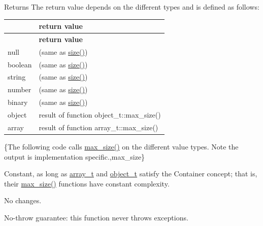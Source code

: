 \begin{DoxyReturn}{Returns}
The return value depends on the different types and is defined as follows\+: \tabulinesep=1mm
\begin{longtabu} spread 0pt [c]{*2{|X[-1]}|}
\hline
{}&{\bf return value  }\\
\endfirsthead
\hline
\endfoot
\hline
{}&{\bf return value  }\\
\endhead
null &{} (same as {\ttfamily \hyperlink{classnlohmann_1_1basic__json_a33c7c8638bb0b12e6d1b69d8106dd2e0}{size()}}) \\
boolean &{} (same as {\ttfamily \hyperlink{classnlohmann_1_1basic__json_a33c7c8638bb0b12e6d1b69d8106dd2e0}{size()}}) \\
string &{} (same as {\ttfamily \hyperlink{classnlohmann_1_1basic__json_a33c7c8638bb0b12e6d1b69d8106dd2e0}{size()}}) \\
number &{} (same as {\ttfamily \hyperlink{classnlohmann_1_1basic__json_a33c7c8638bb0b12e6d1b69d8106dd2e0}{size()}}) \\
binary &{} (same as {\ttfamily \hyperlink{classnlohmann_1_1basic__json_a33c7c8638bb0b12e6d1b69d8106dd2e0}{size()}}) \\
object &result of function {\ttfamily object\+\_\+t\+::max\+\_\+size()} \\
array &result of function {\ttfamily array\+\_\+t\+::max\+\_\+size()} \\
\end{longtabu}
\{The following code calls {\ttfamily \hyperlink{classnlohmann_1_1basic__json_a1b46c6631e30b8394e89bd1546d69736}{max\+\_\+size()}} on the different value types. Note the output is implementation specific.,max\+\_\+size\}
\end{DoxyReturn}
Constant, as long as \hyperlink{classnlohmann_1_1basic__json_a53700c308d804f84aea5ff05abb2ac4e}{array\+\_\+t} and \hyperlink{classnlohmann_1_1basic__json_a5e3df077f880583a96d74cd63e173cb2}{object\+\_\+t} satisfy the Container concept; that is, their {\ttfamily \hyperlink{classnlohmann_1_1basic__json_a1b46c6631e30b8394e89bd1546d69736}{max\+\_\+size()}} functions have constant complexity.

No changes.

No-\/throw guarantee\+: this function never throws exceptions.

